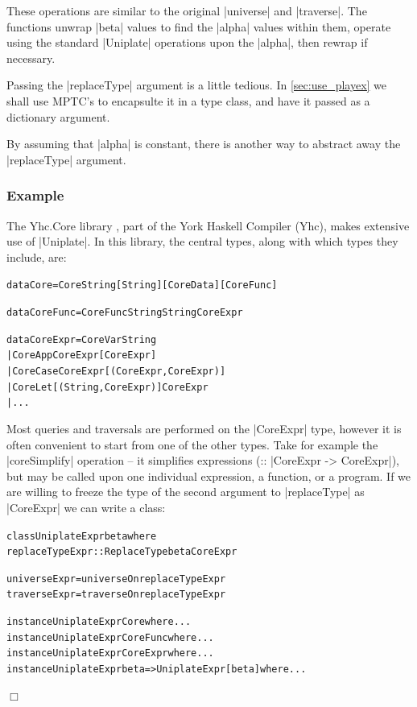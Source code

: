 \documentclass[preprint]{sigplanconf}
\newcounter{exmp}
\newcommand{\yesexample}{\subsubsection*{Example \arabic{exmp}}\refstepcounter{exmp}}
\newcommand{\noexample}{\hfill$\Box$}
\newenvironment{code}{\begin{alltt}\small}{\end{alltt}}
\newenvironment{example}{\yesexample}{\noexample}
\begin{document}
These operations are similar to the original |universe| and |traverse|. The functions unwrap |beta| values to find the |alpha| values within them, operate using the standard |Uniplate| operations upon the |alpha|, then rewrap if necessary.

Passing the |replaceType| argument is a little tedious. In \ref{sec:use_playex} we shall use MPTC's to encapsulte it in a type class, and have it passed as a dictionary argument.

By assuming that |alpha| is constant, there is another way to abstract away the |replaceType| argument.

\begin{example}
The Yhc.Core library \cite{me:yhc_core}, part of the York Haskell Compiler (Yhc), makes extensive use of |Uniplate|. In this library, the central types, along with which types they include, are:

\begin{code}
data Core      =  Core String [String] [CoreData] [CoreFunc]

data CoreFunc  =  CoreFunc String String CoreExpr

data CoreExpr  =  CoreVar   String
               |  CoreApp   CoreExpr  [CoreExpr]
               |  CoreCase  CoreExpr  [(CoreExpr, CoreExpr)]
               |  CoreLet   [(String, CoreExpr)] CoreExpr
               |  ...
\end{code}

Most queries and traversals are performed on the |CoreExpr| type, however it is often convenient to start from one of the other types. Take for example the |coreSimplify| operation -- it simplifies expressions (:: |CoreExpr -> CoreExpr|), but may be called upon one individual expression, a function, or a program. If we are willing to freeze the type of the second argument to |replaceType| as |CoreExpr| we can write a class:

\begin{code}
class  UniplateExpr beta where
       replaceTypeExpr :: ReplaceType beta CoreExpr

universeExpr  = universeOn  replaceTypeExpr
traverseExpr  = traverseOn  replaceTypeExpr

instance UniplateExpr Core where ...
instance UniplateExpr CoreFunc where ...
instance UniplateExpr CoreExpr where ...
instance UniplateExpr beta => UniplateExpr [beta] where ...
\end{code}
\end{example}
\end{document}
